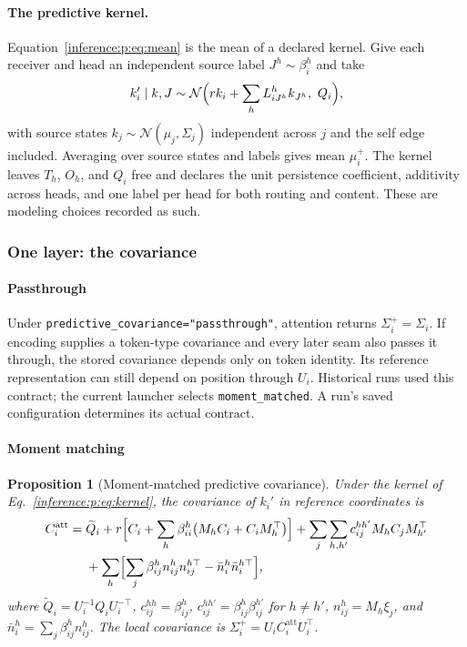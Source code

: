 \documentclass[11pt]{article}
\newtheorem{proposition}[theorem]{Proposition}
\theoremstyle{definition}
\theoremstyle{remark}
\providecommand{\cfg}[1]{{\small\texttt{#1}}}
\providecommand{\N}{\mathcal{N}}
\begin{document}
\paragraph{The predictive kernel.}
Equation~\eqref{inference:p:eq:mean} is the mean of a declared kernel. Give each receiver and head an independent source label $J^{h}\sim\beta_i^{h}$ and take
\begin{equation}
k_i'\mid k,J\sim\N\Bigl(rk_i+\sum_hL_{iJ^{h}}^{h}k_{J^{h}},\ Q_i\Bigr),
\label{inference:p:eq:kernel}
\end{equation}
with source states $k_j\sim\N(\mu_j,\Sigma_j)$ independent across $j$ and the self edge included. Averaging over source states and labels gives mean $\mu_i^{+}$. The kernel leaves $T_h$, $O_h$, and $Q_i$ free and declares the unit persistence coefficient, additivity across heads, and one label per head for both routing and content. These are modeling choices recorded as such.

\subsubsection{One layer: the covariance}
\label{inference:p:sec:covariance}

\paragraph{Passthrough}

Under \cfg{predictive\_covariance="passthrough"}, attention returns $\Sigma_i^+=\Sigma_i$. If encoding supplies a token-type covariance and every later seam also passes it through, the stored covariance depends only on token identity. Its reference representation can still depend on position through $U_i$. Historical runs used this contract; the current launcher selects \cfg{moment\_matched}. A run's saved configuration determines its actual contract.

\paragraph{Moment matching}

\begin{proposition}[Moment-matched predictive covariance]
\label{inference:p:prop:covariance}
Under the kernel of Eq.~\eqref{inference:p:eq:kernel}, the covariance of $k_i'$ in reference coordinates is
\begin{equation}
\begin{aligned}
C_i^{\mathrm{att}}={}&\widetilde Q_i
+r\Bigl[C_i+\sum_h\beta_{ii}^{h}\bigl(M_hC_i+C_iM_h^{\top}\bigr)\Bigr]
+\sum_j\sum_{h,h'}c_{ij}^{hh'}M_hC_jM_{h'}^{\top}\\
&+\sum_h\Bigl[\sum_j\beta_{ij}^{h}n_{ij}^{h}n_{ij}^{h\top}-\bar n_i^{h}\bar n_i^{h\top}\Bigr],
\end{aligned}
\label{inference:p:eq:covariance}
\end{equation}
where $\widetilde Q_i=U_i^{-1}Q_iU_i^{-\top}$, $c_{ij}^{hh}=\beta_{ij}^{h}$, $c_{ij}^{hh'}=\beta_{ij}^{h}\beta_{ij}^{h'}$ for $h\ne h'$, $n_{ij}^{h}=M_h\xi_j$, and $\bar n_i^{h}=\sum_j\beta_{ij}^{h}n_{ij}^{h}$. The local covariance is $\Sigma_i^{+}=U_iC_i^{\mathrm{att}}U_i^{\top}$.
\end{proposition}
\end{document}

